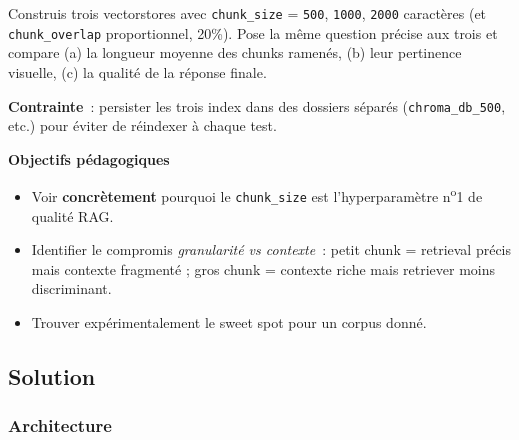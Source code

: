 \documentclass[11pt,a4paper]{article}
\begin{document}
\begin{tcolorbox}[title=Exercice bonus 1. Mesurer expérimentalement l'effet du découpage]
Construis trois vectorstores avec \texttt{chunk\_size} = \texttt{500},
\texttt{1000}, \texttt{2000} caractères (et \texttt{chunk\_overlap}
proportionnel, 20\%). Pose la même question précise aux trois et compare
(a) la longueur moyenne des chunks ramenés, (b) leur pertinence visuelle,
(c) la qualité de la réponse finale.

\textbf{Contrainte}~: persister les trois index dans des dossiers
séparés (\texttt{chroma\_db\_500}, etc.) pour éviter de réindexer à
chaque test.

\bigskip
\noindent\textbf{Objectifs pédagogiques}
\begin{itemize}[leftmargin=*]
  \item Voir \textbf{concrètement} pourquoi le \texttt{chunk\_size} est
        l'hyperparamètre n\textsuperscript{o}1 de qualité RAG.
  \item Identifier le compromis \emph{granularité vs contexte}~: petit
        chunk = retrieval précis mais contexte fragmenté ; gros chunk =
        contexte riche mais retriever moins discriminant.
  \item Trouver expérimentalement le sweet spot pour un corpus donné.
\end{itemize}
\end{tcolorbox}

\subsection{Solution}

\subsubsection{Architecture}

\begin{center}
\end{center}
\end{document}
